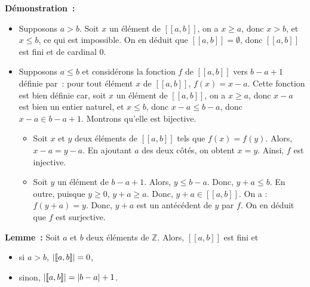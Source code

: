 \noindent\textbf{Démonstration :}
    \begin{itemize}[nosep]
        \item Supposons $a > b$. 
            Soit $x$ un élément de $[\![a,b]\!]$, on a $x \geq a$, donc $x > b$, et $x \leq b$, ce qui est impossible.
            On en déduit que $[\![a, b]\!] = \emptyset$, donc $[\![a, b]\!]$ est fini et de cardinal $0$.
        \item Supposons $a \leq b$ et considérons la fonction $f$ de $[\![a, b]\!]$ vers $b-a+1$ définie par : pour tout élément $x$ de $[\![a, b]\!]$, $f(x) = x - a$. 
            Cette fonction est bien définie car, soit $x$ un élément de $[\![a, b]\!]$, on a $x \geq a$, donc $x - a$ est bien un entier naturel, et $x \leq b$, donc $x - a \leq b - a$, donc $x-a \in b-a+1$. 
            Montrons qu'elle est bijective.
            \begin{itemize}[nosep]
                \item Soit $x$ et $y$ deux éléments de $[\![a, b]\!]$ tels que $f(x) = f(y)$.
                    Alors, $x-a = y-a$. 
                    En ajoutant $a$ des deux côtés, on obtent $x = y$.
                    Ainsi, $f$ est injective.
                \item Soit $y$ un élément de $b-a+1$. 
                    Alors, $y \leq b-a$. 
                    Donc, $y + a \leq b$.
                    En outre, puisque $y \geq 0$, $y + a \geq a$.
                    Donc, $y+a \in [\![a,b]\!]$.
                    On a  : $f(y+a) = y$. 
                    Donc, $y+a$ est un antécédent de $y$ par $f$. 
                    On en déduit que $f$ est surjective.
            \end{itemize}
    \end{itemize}

    \hfill \square

\medskip

\noindent\textbf{Lemme :} Soit $a$ et $b$ deux éléments de $\mathbb{Z}$. 
    Alors, $[\![a, b]\!]$ est fini et
    \begin{itemize}[nosep]
        \item si $a > b$, $\left\lvert [\![a, b]\!] \right\rvert = 0$, 
        \item sinon, $\left\lvert [\![a,b]\!] \right\rvert = \left\lvert b - a \right\rvert + 1$.
    \end{itemize}

\medskip


